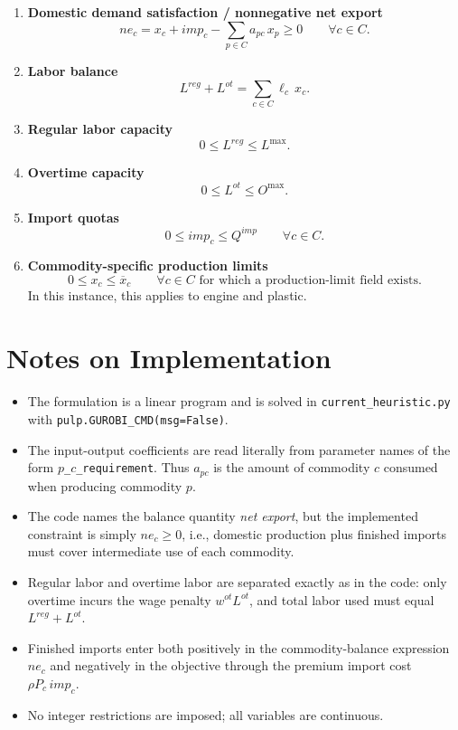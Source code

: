 \begin{enumerate}
    \item \textbf{Domestic demand satisfaction / nonnegative net export}
    \[
    ne_c = x_c + imp_c - \sum_{p \in C} a_{pc}\,x_p \ge 0
    \qquad \forall c \in C.
    \]

    \item \textbf{Labor balance}
    \[
    L^{reg} + L^{ot} = \sum_{c \in C} \ell_c\, x_c.
    \]

    \item \textbf{Regular labor capacity}
    \[
    0 \le L^{reg} \le L^{\max}.
    \]

    \item \textbf{Overtime capacity}
    \[
    0 \le L^{ot} \le O^{\max}.
    \]

    \item \textbf{Import quotas}
    \[
    0 \le imp_c \le Q^{imp}
    \qquad \forall c \in C.
    \]

    \item \textbf{Commodity-specific production limits}
    \[
    0 \le x_c \le \overline{x}_c
    \qquad \forall c \in C \text{ for which a production-limit field exists.}
    \]
    In this instance, this applies to engine and plastic.
\end{enumerate}

\section*{Notes on Implementation}

\begin{itemize}
    \item The formulation is a linear program and is solved in \texttt{current\_heuristic.py} with \texttt{pulp.GUROBI\_CMD(msg=False)}.
    \item The input-output coefficients are read literally from parameter names of the form \texttt{\(p\)\_\(c\)\_requirement}. Thus \(a_{pc}\) is the amount of commodity \(c\) consumed when producing commodity \(p\).
    \item The code names the balance quantity \emph{net export}, but the implemented constraint is simply \(ne_c \ge 0\), i.e., domestic production plus finished imports must cover intermediate use of each commodity.
    \item Regular labor and overtime labor are separated exactly as in the code: only overtime incurs the wage penalty \(w^{ot}L^{ot}\), and total labor used must equal \(L^{reg}+L^{ot}\).
    \item Finished imports enter both positively in the commodity-balance expression \(ne_c\) and negatively in the objective through the premium import cost \(\rho P_c\,imp_c\).
    \item No integer restrictions are imposed; all variables are continuous.
\end{itemize}

